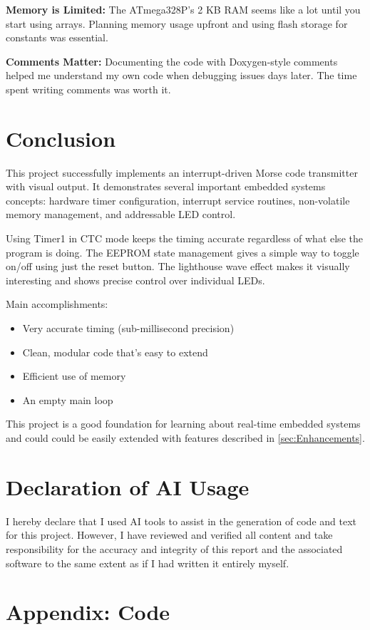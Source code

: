 \documentclass[report]{IEEEtran}
\begin{document}
\textbf{Memory is Limited:}
The ATmega328P's 2 KB RAM seems like a lot until you start using arrays. Planning memory usage upfront and using flash storage for constants was essential.

\textbf{Comments Matter:}
Documenting the code with Doxygen-style comments helped me understand my own code when debugging issues days later. The time spent writing comments was worth it.

\section{Conclusion}
This project successfully implements an interrupt-driven Morse code transmitter with visual output. 
It demonstrates several important embedded systems concepts: hardware timer configuration, interrupt service routines, non-volatile memory management, and addressable LED control.

Using Timer1 in CTC mode keeps the timing accurate regardless of what else the program is doing. 
The EEPROM state management gives a simple way to toggle on/off using just the reset button. 
The lighthouse wave effect makes it visually interesting and shows precise control over individual LEDs.

Main accomplishments:
\begin{itemize}
    \item Very accurate timing (sub-millisecond precision)
    \item Clean, modular code that's easy to extend
    \item Efficient use of memory
    \item An empty main loop
\end{itemize}

This project is a good foundation for learning about real-time embedded systems and could could be easily extended with features described in \ref{sec:Enhancements}. 

\section*{Declaration of AI Usage}
I hereby declare that I used AI tools to assist in the generation of code and text for this project. However, I have reviewed and verified all content and take responsibility for the accuracy and integrity of this report and the associated software to the same extent as if I had written it entirely myself.

\onecolumn
\section{Appendix: Code}\label{sec:appendix_code}

\end{document}

